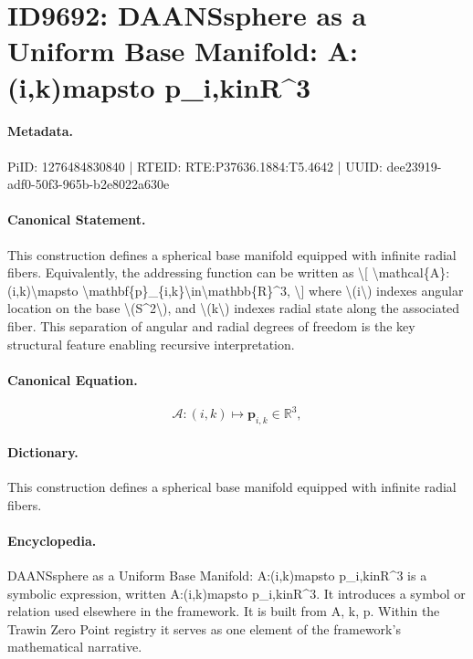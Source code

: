 \section*{ID9692: DAANSsphere as a Uniform Base Manifold: A:(i,k)mapsto p\_i,kinR\textasciicircum{}3}
\paragraph{Metadata.}
PiID: 1276484830840 | RTEID: RTE:P37636.1884:T5.4642 | UUID: dee23919-adf0-50f3-965b-b2e8022a630e

\paragraph{Canonical Statement.}
This construction defines a spherical base manifold equipped with infinite radial fibers. Equivalently, the addressing function can be written as \textbackslash{}[ \textbackslash{}mathcal\{A\}:(i,k)\textbackslash{}mapsto \textbackslash{}mathbf\{p\}\_\{i,k\}\textbackslash{}in\textbackslash{}mathbb\{R\}\textasciicircum{}3, \textbackslash{}] where \textbackslash{}(i\textbackslash{}) indexes angular location on the base \textbackslash{}(S\textasciicircum{}2\textbackslash{}), and \textbackslash{}(k\textbackslash{}) indexes radial state along the associated fiber. This separation of angular and radial degrees of freedom is the key structural feature enabling recursive interpretation.

\paragraph{Canonical Equation.}
\[
\mathcal{A}:(i,k)\mapsto \mathbf{p}_{i,k}\in\mathbb{R}^3,
\]

\paragraph{Dictionary.}
This construction defines a spherical base manifold equipped with infinite radial fibers.

\paragraph{Encyclopedia.}
DAANSsphere as a Uniform Base Manifold: A:(i,k)mapsto p\_i,kinR\textasciicircum{}3 is a symbolic expression, written A:(i,k)mapsto p\_i,kinR\textasciicircum{}3. It introduces a symbol or relation used elsewhere in the framework. It is built from A, k, p. Within the Trawin Zero Point registry it serves as one element of the framework's mathematical narrative.
